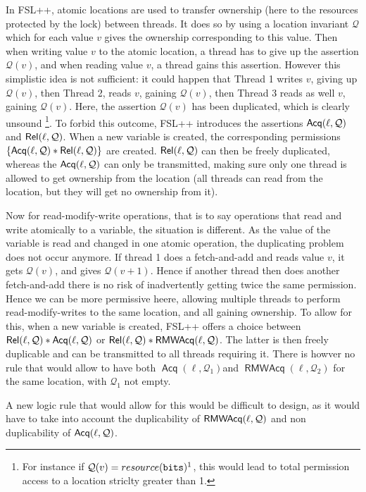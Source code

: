 In FSL++, atomic locations are used to transfer ownership (here to the resources protected by the lock) between threads. It does so by using a location invariant $\mathcal{Q}$ which for each value $v$ gives the ownership corresponding to this value. Then when writing value $v$ to the atomic location, a thread has to give up the assertion $\mathcal{Q}(v)$, and when reading value $v$, a thread gains this assertion. However this simplistic idea is not sufficient: it could happen that Thread 1 writes $v$, giving up $\mathcal{Q}(v)$, then Thread 2, reads $v$, gaining $\mathcal{Q}(v)$, then Thread 3 reads as well $v$, gaining $\mathcal{Q}(v)$. Here, the assertion $\mathcal{Q}(v)$ has been duplicated, which is clearly unsound \footnote{For instance if $\mathcal{Q}(v) = resource(\texttt{bits})^{1}$, this would lead to total permission access to a location striclty greater than 1.}. To forbid this outcome, FSL++ introduces the assertions $\operatorname{\mathsf{Acq}}(\ell, \mathcal{Q})$ and $\operatorname{\mathsf{Rel}}(\ell, \mathcal{Q})$. When a new variable is created, the corresponding permissions $\{\operatorname{\mathsf{Acq}}(\ell, \mathcal{Q}) * \operatorname{\mathsf{Rel}}(\ell, \mathcal{Q})\}$ are created. $\operatorname{\mathsf{Rel}}(\ell, \mathcal{Q})$ can then be freely duplicated, whereas the $\operatorname{\mathsf{Acq}}(\ell, \mathcal{Q})$ can only be transmitted, making sure only one thread is allowed to get ownership from the location (all threads can read from the location, but they will get no ownership from it). 

Now for read-modify-write operations, that is to say operations that read and write atomically to a variable, the situation is different. As the value of the variable is read and changed in one atomic operation, the duplicating problem does not occur anymore. If thread 1 does a fetch-and-add and reads value $v$, it gets $\mathcal{Q}(v)$, and gives $\mathcal{Q}(v + 1)$. Hence if another thread then does another fetch-and-add there is no risk of inadvertently getting twice the same permission. Hence we can be more permissive heere, allowing multiple threads to perform read-modify-writes to the same location, and all gaining ownership. To allow for this, when a new variable is created, FSL++ offers a choice between $\operatorname{\mathsf{Rel}}(\ell, \mathcal{Q}) * \operatorname{\mathsf{Acq}}(\ell, \mathcal{Q})$ or $\operatorname{\mathsf{Rel}}(\ell, \mathcal{Q}) * \operatorname{\mathsf{RMWAcq}}(\ell, \mathcal{Q})$. The latter is then freely duplicable and can be transmitted to all threads requiring it. There is howver no rule that would allow to have both $\operatorname{\mathsf{Acq}}(\ell, \mathcal{Q}_1)$and $\operatorname{\mathsf{RMWAcq}}(\ell, \mathcal{Q}_2)$ for the same location, with $\mathcal{Q}_1$ not empty.

A new logic rule that would allow for this would be difficult to design, as it would have to take into account the duplicability of $\operatorname{\mathsf{RMWAcq}}(\ell, \mathcal{Q})$ and non duplicability of $\operatorname{\mathsf{Acq}}(\ell, \mathcal{Q})$.

